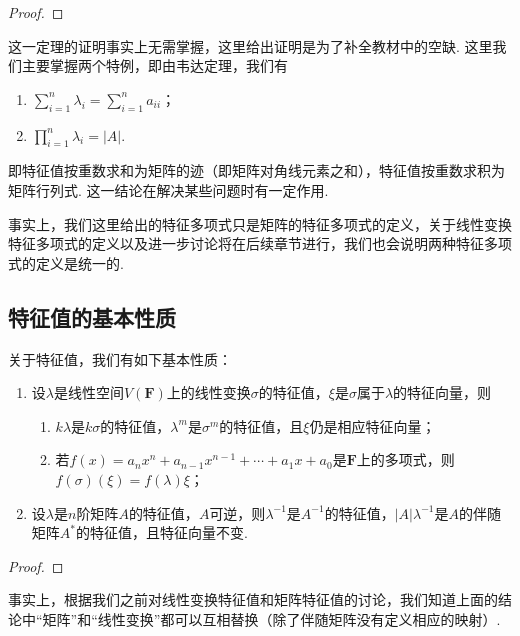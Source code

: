 \begin{proof}

\end{proof}

这一定理的证明事实上无需掌握，这里给出证明是为了补全教材中的空缺. 这里我们主要掌握两个特例，即由韦达定理，我们有
\begin{enumerate}
    \item $\displaystyle\sum_{i=1}^{n}\lambda_i=\displaystyle\sum_{i=1}^{n}a_{ii}$；

    \item $\displaystyle\prod_{i=1}^{n}\lambda_i=|A|$.
\end{enumerate}
即特征值按重数求和为矩阵的迹（即矩阵对角线元素之和），特征值按重数求积为矩阵行列式. 这一结论在解决某些问题时有一定作用.

事实上，我们这里给出的特征多项式只是矩阵的特征多项式的定义，关于线性变换特征多项式的定义以及进一步讨论将在后续章节进行，我们也会说明两种特征多项式的定义是统一的.

\subsection{特征值的基本性质}

关于特征值，我们有如下基本性质：
\begin{enumerate}
    \item 设$\lambda$是线性空间$V(\mathbf{F})$上的线性变换$\sigma$的特征值，$\xi$是$\sigma$属于$\lambda$的特征向量，则
          \begin{enumerate}
              \item $k\lambda$是$k\sigma$的特征值，$\lambda^m$是$\sigma^m$的特征值，且$\xi$仍是相应特征向量；

              \item 若$f(x)=a_nx^n+a_{n-1}x^{n-1}+\cdots+a_1x+a_0$是$\mathbf{F}$上的多项式，则$f(\sigma)(\xi)=f(\lambda)\xi$；
          \end{enumerate}

    \item 设$\lambda$是$n$阶矩阵$A$的特征值，$A$可逆，则$\lambda^{-1}$是$A^{-1}$的特征值，$|A|\lambda^{-1}$是$A$的伴随矩阵$A^*$的特征值，且特征向量不变.
\end{enumerate}

\begin{proof}

\end{proof}

事实上，根据我们之前对线性变换特征值和矩阵特征值的讨论，我们知道上面的结论中``矩阵''和``线性变换''都可以互相替换（除了伴随矩阵没有定义相应的映射）.


